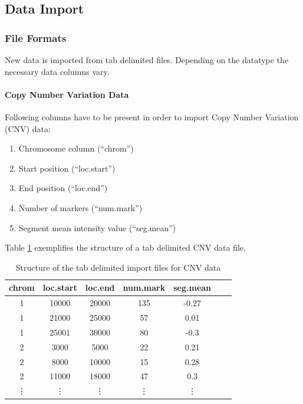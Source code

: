 \documentclass[11pt,final]{article}
\begin{document}
\subsection{Data Import}
\label{fo-import}

\subsubsection{File Formats}
\label{file-formats}

New data is imported from tab delimited files. Depending on the datatype the
necessary data columns vary.


\paragraph{Copy Number Variation Data}

Following columns have to be present in order to import Copy Number Variation
(CNV) data:

\begin{enumerate}
  \item Chromosome column (``chrom'')
  \item Start position (``loc.start'')
  \item End position (``loc.end'')
  \item Number of markers (``num.mark'')
  \item Segment mean intensity value (``seg.mean'')
\end{enumerate}

Table \ref{tab:tsv_cnv} exemplifies the structure of a tab delimited CNV data file.

\begin{table}
	\centering
	\begin{tabular}[h]{|c|c|c|c|c|c|c|}
	  \hline
	 chrom & loc.start & loc.end & num.mark & seg.mean \\ \hline
	 1 & 10000 & 20000 & 135 & -0.27 \\
	 1 & 21000 & 25000 & 57 & 0.01 \\
	 1 & 25001 & 30000 & 80 & -0.3 \\
	 2 & 3000 & 5000 & 22 & 0.21 \\
	 2 & 8000 & 10000 & 15 & 0.28 \\
	 2 & 11000 & 18000 & 47 & 0.3 \\
	 \vdots & \vdots & \vdots & \vdots & \vdots \\
	\end{tabular}
	\caption{Structure of the tab delimited import files for CNV data}
	\label{tab:tsv_cnv}
\end{table}
\end{document}
